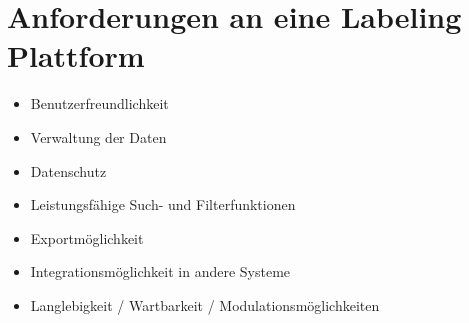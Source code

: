 \section{Anforderungen an eine Labeling Plattform}\label{sec:basics-requirements}

\begin{itemize}
  \item Benutzerfreundlichkeit
  \item Verwaltung der Daten
  \item Datenschutz
  \item Leistungsfähige Such- und Filterfunktionen
  \item Exportmöglichkeit
  \item Integrationsmöglichkeit in andere Systeme
  \item Langlebigkeit / Wartbarkeit / Modulationsmöglichkeiten
\end{itemize}